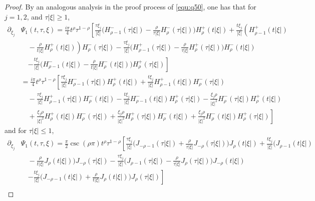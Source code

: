 \documentclass[11pt,twoside]{article}
\theoremstyle{plain}
\theoremstyle{definition}
\theoremstyle{remark}
\numberwithin{equation}{section}
\begin{document}
\begin{proof}
By an analogous analysis in the proof process of \eqref{equ:q50}, one has that
for $j=1,2$, and $\tau|\xi|\geq1$,
\begin{equation}\label{equ:l15}
\begin{aligned}
\partial_{\xi_j}&\Psi_1(t, \tau, \xi)=\frac{i \pi}{4} t^\rho \tau^{1-\rho}\left[\frac{\tau\xi_j}{|\xi|}\big(H_{\rho-1}^{-}(\tau|\xi|)
-\frac{\rho}{\tau|\xi|} H_\rho^{-}(\tau|\xi|)\big) H_\rho^{+}(t|\xi|)+\frac{t\xi_j}{|\xi|}\left(H_{\rho-1}^{+}(t|\xi|)\right.\right. \\
& \quad-\left.\frac{\rho}{t|\xi|} H_\rho^{+}(t|\xi|)\right) H_\rho^{-}(\tau|\xi|)-\frac{\tau\xi_j}{|\xi|}\big(H_{\rho-1}^{+}(\tau|\xi|)-\frac{\rho}{\tau|\xi|} H_\rho^{+}(\tau|\xi|)\big) H_\rho^{-}(t|\xi|)\\
&\quad\left.-\frac{t\xi_j}{|\xi|}\big(H_{\rho-1}^{-}(t|\xi|)-\frac{\rho}{t|\xi|} H_\rho^{-}(t|\xi|)\big) H_\rho^{+}(\tau|\xi|)\right]\\
& =\frac{i \pi}{4}t^\rho \tau^{1-\rho}\left[\frac{\tau\xi_j}{|\xi|} H_{\rho-1}^{-}(\tau|\xi|) H_\rho^{+}(t|\xi|)+\frac{t\xi_j}{|\xi|} H_{\rho-1}^{+}(t|\xi|) H_\rho^{-}(\tau|\xi|)\right. \\
&\quad -\frac{\tau\xi_j}{|\xi|} H_{\rho-1}^{+}(\tau|\xi|) H_\rho^{-}(t|\xi|)
-\frac{t\xi_j}{|\xi|} H_{\rho-1}^{-}(t|\xi|) H_\rho^{+}(\tau|\xi|)-\frac{\xi_j\rho}{|\xi|^2} H_\rho^{-}(\tau|\xi|) H_\rho^{+}(t|\xi|)\\
& \left.\quad +\frac{\xi_j\rho}{|\xi|^2} H_\rho^{+}(t|\xi|) H_\rho^{-}(\tau|\xi|) +\frac{\xi_j\rho}{|\xi|^2} H_\rho^{+}(\tau|\xi|) H_\rho^{-}(t|\xi|)+\frac{\xi_j\rho}{|\xi|^2} H_\rho^{-}(t|\xi|) H_\rho^{+}(\tau|\xi|)\right]
\end{aligned}
\end{equation}
and for $\tau|\xi|\leq 1$,
\begin{equation}\label{equ:l17}
\begin{aligned}
\partial_{\xi_j}& \Psi_1(t, \tau, \xi)=\frac{ \pi}{2}\csc(\rho\pi) t^\rho \tau^{1-\rho}\left[\frac{\tau\xi_j}{|\xi|}\big(J_{-\rho-1}(\tau|\xi|)+\frac{\rho}{\tau|\xi|} J_{-\rho}(\tau|\xi|)\big) J_\rho(t|\xi|)+\frac{t\xi_j}{|\xi|}\bigg(J_{\rho-1}(t|\xi|)\right. \\
& \quad-\frac{\rho}{t|\xi|} J_\rho(t|\xi|)\bigg) J_{-\rho}(\tau|\xi|)-\frac{\tau\xi_j}{|\xi|}\big(J_{\rho-1}(\tau|\xi|)-\frac{\rho}{\tau|\xi|} J_\rho(\tau|\xi|)\big) J_{-\rho}(t|\xi|) \\
& \quad\left. -\frac{t\xi_j}{|\xi|}\big(J_{-\rho-1}(t|\xi|)+\frac{\rho}{t|\xi|} J_\rho(t|\xi|)\big) J_\rho(\tau|\xi|)\right]  \\

\end{aligned}
\end{equation}
\end{proof}
\end{document}
